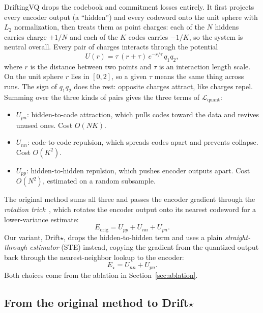 \documentclass[10pt,twocolumn,letterpaper]{article}
\begin{document}
DriftingVQ \cite{liu2026drift} drops the codebook and commitment losses entirely.
It first projects every encoder output (a ``hidden'') and every codeword onto the unit
sphere with $L_2$ normalization, then treats them as point charges: each of the $N$
hiddens carries charge $+1/N$ and each of the $K$ codes carries $-1/K$, so the system
is neutral overall. Every pair of charges interacts through the potential
\begin{equation}
U(r) = \tau\,(r+\tau)\,e^{-r/\tau}\,q_1 q_2,
\label{eq:potential}
\end{equation}
where $r$ is the distance between two points and $\tau$ is an interaction length scale.
On the unit sphere $r$ lies in $[0,2]$, so a given $\tau$ means the same thing across
runs. The sign of $q_1 q_2$ does the rest: opposite charges attract, like charges
repel. Summing over the three kinds of pairs gives the three terms of
$\mathcal{L}_{\mathrm{quant}}$:
\begin{itemize}\itemsep1pt
  \item $U_{pn}$: hidden-to-code attraction, which pulls codes toward the data and
  revives unused ones. Cost $O(NK)$.
  \item $U_{nn}$: code-to-code repulsion, which spreads codes apart and prevents
  collapse. Cost $O(K^2)$.
  \item $U_{pp}$: hidden-to-hidden repulsion, which pushes encoder outputs apart. Cost
  $O(N^2)$, estimated on a random subsample.
\end{itemize}
The original method sums all three and passes the encoder gradient through the
\emph{rotation trick}~\cite{rotationtrick}, which rotates the encoder output onto its
nearest codeword for a lower-variance estimate:
\begin{equation}
E_{\mathrm{orig}} = U_{pp} + U_{nn} + U_{pn}.
\label{eq:eliu}
\end{equation}
Our variant, Drift$\star$, drops the hidden-to-hidden term and uses a plain
\emph{straight-through estimator} (STE) instead, copying the gradient from the
quantized output back through the nearest-neighbor lookup to the encoder:
\begin{equation}
E_{\star} = U_{nn} + U_{pn}.
\label{eq:estar}
\end{equation}
Both choices come from the ablation in Section~\ref{sec:ablation}.

\subsection{From the original method to Drift$\star$}
\end{document}
